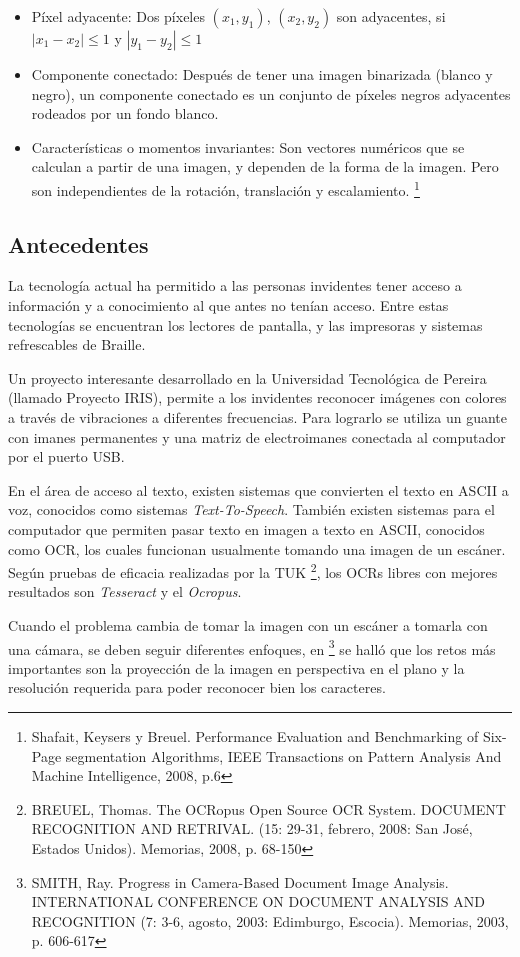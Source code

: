 \documentclass[a4paper, 11pt, oneside]{article}
\begin{document}
\begin{itemize}
    \item Píxel adyacente: Dos píxeles $(x_1,y_1)$, $(x_2,y_2)$ son adyacentes, si $|x_1-x_2| \le 1$
    y $|y_1-y_2| \le 1$
    \item Componente conectado: Después de tener una imagen binarizada (blanco y negro), un
    componente conectado es un conjunto de píxeles negros adyacentes rodeados por un fondo blanco.
    \item Características o momentos invariantes: Son vectores numéricos que se calculan a partir
    de una imagen, y dependen de la forma de la imagen. Pero son independientes de la rotación,
    translación y escalamiento.
    \footnote{Shafait, Keysers y Breuel. Performance Evaluation and Benchmarking of Six-Page segmentation
    Algorithms, IEEE Transactions on Pattern Analysis And Machine Intelligence, 2008, p.6}
   
	\end{itemize}
	
	\subsection {Antecedentes}
	La tecnología actual ha permitido a las personas invidentes tener acceso a información
	y a conocimiento al que antes no tenían acceso. Entre estas tecnologías se encuentran los
	lectores de pantalla, y las impresoras y sistemas refrescables de Braille.
	
	Un proyecto interesante desarrollado en la Universidad Tecnológica de Pereira (llamado 
    Proyecto IRIS), permite a los invidentes reconocer imágenes con colores a través de 
    vibraciones a diferentes frecuencias. Para lograrlo se utiliza un guante con imanes 
	permanentes y una matriz de electroimanes conectada al computador por el puerto USB.

	En el área de acceso al texto, existen sistemas que convierten el texto en ASCII a voz,
	conocidos como sistemas \textit{Text-To-Speech}. También existen sistemas para el computador
	que permiten pasar texto en imagen a texto en ASCII, conocidos como OCR, los cuales funcionan
	usualmente tomando una imagen de un escáner. Según pruebas de eficacia realizadas por la TUK
    \footnote{BREUEL, Thomas. The OCRopus Open Source OCR System. DOCUMENT RECOGNITION AND RETRIVAL. 
    (15: 29-31, febrero, 2008: San José, Estados Unidos). Memorias, 2008, p. 68-150},
    los OCRs libres con mejores resultados son \textit{Tesseract} y el  \textit{Ocropus}. 

    Cuando el problema cambia de tomar la imagen con un escáner a tomarla con una cámara, 
    se deben seguir diferentes enfoques, en \footnote{SMITH, Ray. Progress in Camera-Based Document
    Image Analysis. INTERNATIONAL CONFERENCE ON DOCUMENT ANALYSIS AND RECOGNITION (7: 3-6, agosto,
    2003: Edimburgo, Escocia). Memorias, 2003, p. 606-617} se halló que los retos más importantes 
    son la proyección de la imagen en perspectiva en el plano y la  resolución requerida para poder
    reconocer bien los caracteres.
\end{document}
